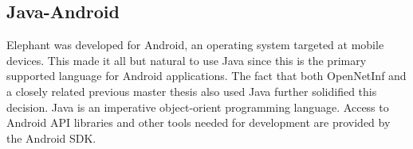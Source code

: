 \subsection{Java-Android}

Elephant was developed for Android, an operating system targeted at mobile devices. This made it all but natural to use Java since this is the primary supported language for Android applications. The fact that both OpenNetInf and a closely related previous master thesis \cite{masterthesis} also used Java further solidified this decision. Java is an imperative object-orient programming language. Access to Android API libraries and other tools needed for development are provided by the Android SDK.
